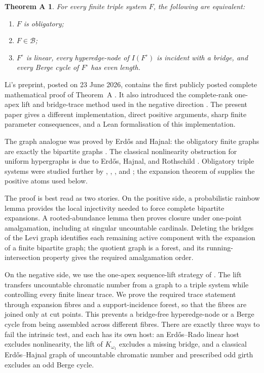 \documentclass[a4paper,11pt,reqno]{amsart}
\theoremstyle{plain}
\newtheorem*{theoremA}{Theorem A}
\theoremstyle{definition}
\theoremstyle{remark}
\begin{document}
\begin{theoremA}\label{theorem-a-exact-characterisation}
For every finite triple system $F$, the following are equivalent:
\begin{enumerate}
\item $F$ is obligatory;
\item $F\in\mathcal B$;
\item $F^\circ$ is linear, every hyperedge-node of $I(F^\circ)$ is incident
with a bridge, and every Berge cycle of $F^\circ$ has even length.
\end{enumerate}
\end{theoremA}

Li's preprint, posted on 23 June 2026, contains the first publicly posted
complete mathematical proof of Theorem~A \citep[Theorem~1.1]{li2026}.  It
also introduced the complete-rank one-apex lift and bridge-trace method used
in the negative direction \citep[Sections~3--4 and Theorem~4.6]{li2026}.
The present paper gives a different implementation, direct positive
arguments, sharp finite parameter consequences, and a Lean formalisation of
this implementation.

The graph analogue was proved by Erdős and Hajnal: the obligatory finite
graphs are exactly the bipartite graphs
\citep[Corollary~5.6 and Theorem~7.4]{erdoshajnal1966}.  The classical
nonlinearity obstruction for uniform hypergraphs is due to Erdős, Hajnal,
and Rothschild \citep[Theorem~2, p.~532]{ehr1973}.  Obligatory triple
systems were studied further by \citet{egh1975}, \citet{komjath2001},
\citet{hajnalkomjath2008}, and \citet{komjath2008}; the expansion theorem of
\citet[Theorem~1.2]{reiher2024} supplies the positive atoms used below.

The proof is best read as two stories.  On the positive side, a
probabilistic rainbow lemma provides the local injectivity needed to force
complete bipartite expansions.  A rooted-abundance lemma then proves closure
under one-point amalgamation, including at singular uncountable cardinals.
Deleting the bridges of the Levi graph identifies each remaining active
component with the expansion of a finite bipartite graph; the quotient graph
is a forest, and its running-intersection property gives the required
amalgamation order.

On the negative side, we use the one-apex sequence-lift strategy of
\citet[Sections~3--4]{li2026}.  The lift transfers uncountable chromatic
number from a graph to a triple system while controlling every finite linear
trace.  We prove the required trace statement through expansion fibres and a
support-incidence forest, so that the fibres are joined only at cut points.
This prevents a bridge-free hyperedge-node or a Berge cycle from being
assembled across different fibres.  There are exactly three ways to fail the
intrinsic test, and each has its own host: an Erdős--Rado linear host excludes
nonlinearity, the lift of $K_{\omega_1}$ excludes a missing bridge, and a
classical Erdős--Hajnal graph of uncountable chromatic number and prescribed
odd girth excludes an odd Berge cycle.
\end{document}
